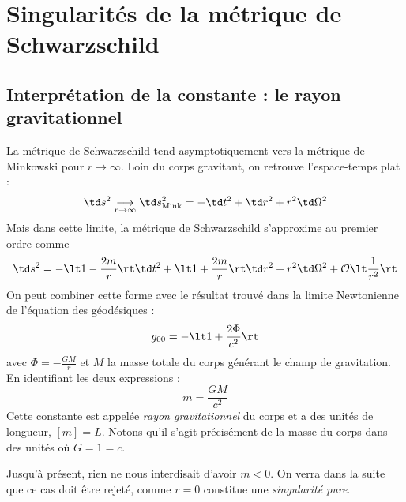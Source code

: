 \section{Singularités de la métrique de Schwarzschild}
\subsection{Interprétation de la constante : le rayon gravitationnel}
La métrique de Schwarzschild tend asymptotiquement vers la métrique de Minkowski pour $r \to \infty$. Loin du corps gravitant, on retrouve l'espace-temps plat :
\begin{equation}
    \td s^2 \underset{r \to \infty}{\longrightarrow} \td s^2_\text{Mink} = - \td t^2 + \td r^2 + r^2 \td \Omega^2
\end{equation}
Mais dans cette limite, la métrique de Schwarzschild s'approxime au premier ordre comme
\begin{equation}
    \td s^2 = - \lt 1 - \frac{2m}{r} \rt \td t^2 + \lt 1 + \frac{2m}{r} \rt \td r^2 + r^2 \td \Omega^2 + \mathcal{O}\lt \frac{1}{r^2} \rt
\end{equation}
On peut combiner cette forme avec le résultat trouvé dans la limite Newtonienne de l'équation des géodésiques :
\begin{equation}
    g_{00} = - \lt 1 + \frac{2 \Phi}{c^2} \rt
\end{equation}
avec $\Phi = -\frac{GM}{r}$ et $M$ la masse totale du corps générant le champ de gravitation. En identifiant les deux expressions :
\begin{equation}
    \boxed{m = \frac{GM}{c^2}}
\end{equation}
Cette constante est appelée \emph{rayon gravitationnel} du corps et a des unités de longueur, $[m] = L$. Notons qu'il s'agit précisément de la masse du corps dans des unités où $G = 1 =c$.
\begin{rmk}
    Jusqu'à présent, rien ne nous interdisait d'avoir $m<0$. On verra dans la suite que ce cas doit être rejeté, comme $r = 0$ constitue une \emph{singularité pure}.
\end{rmk}
